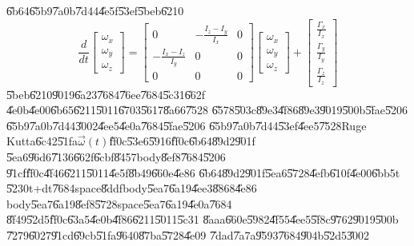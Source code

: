 \documentclass[12pt]{article}
\begin{document}
\U{6b64}\U{65b9}\U{7a0b}\U{7d44}\U{4e5f}\U{53ef}\U{5beb}\U{6210}%
\begin{equation}
\frac{d}{dt}\left[ 
\begin{array}{c}
\omega _{x} \\ 
\omega _{y} \\ 
\omega _{z}%
\end{array}%
\right] =\left[ 
\begin{array}{ccc}
0 & -\frac{I_{z}-I_{y}}{I_{x}} & 0 \\ 
-\frac{I_{x}-I_{z}}{I_{y}} & 0 & 0 \\ 
0 & 0 & 0%
\end{array}%
\right] \left[ 
\begin{array}{c}
\omega _{x} \\ 
\omega _{y} \\ 
\omega _{z}%
\end{array}%
\right] +\left[ 
\begin{array}{c}
\frac{\Gamma _{x}}{I_{x}} \\ 
\frac{\Gamma _{y}}{I_{y}} \\ 
\frac{\Gamma _{z}}{I_{z}}%
\end{array}%
\right] 
\end{equation}%
\U{5beb}\U{6210}\U{9019}\U{6a23}\U{7684}\U{76ee}\U{7684}\U{5c31}\U{662f}%
\U{4e0b}\U{4e00}\U{6b65}\U{6211}\U{5011}\U{6703}\U{5617}\U{8a66}\U{7528}%
\U{6578}\U{503c}\U{89e3}\U{4f86}\U{89e3}\U{9019}\U{500b}\U{5fae}\U{5206}%
\U{65b9}\U{7a0b}\U{7d44}\U{3002}\U{4ee5}\U{4e0a}\U{7684}\U{5fae}\U{5206}%
\U{65b9}\U{7a0b}\U{7d44}\U{53ef}\U{4ee5}\U{7528}Ruge Kutta\U{6c42}\U{51fa}$%
\vec{\omega}(t)$\U{ff0c}\U{53e6}\U{5916}\U{ff0c}\U{6b64}\U{89d2}\U{901f}%
\U{5ea6}\U{96d6}\U{7136}\U{662f}\U{6cbf}\U{8457}body\U{8ef8}\U{7684}\U{5206}%
\U{91cf}\U{ff0c}\U{4f46}\U{6211}\U{5011}\U{4e5f}\U{8b49}\U{660e}\U{4e86}%
\U{6b64}\U{89d2}\U{901f}\U{5ea6}\U{5728}\U{4efb}\U{610f}\U{4e00}\U{6bb5}t%
\U{5230}t+dt\U{7684}space\U{8ddf}body\U{5ea7}\U{6a19}\U{4ee3}\U{8868}\U{4e86}%
body\U{5ea7}\U{6a19}\U{8ef8}\U{5728}space\U{5ea7}\U{6a19}\U{4e0a}\U{7684}%
\U{8f49}\U{52d5}\U{ff0c}\U{63a5}\U{4e0b}\U{4f86}\U{6211}\U{5011}\U{5c31}%
\U{8aaa}\U{660e}\U{5982}\U{4f55}\U{4ee5}\U{5f8c}\U{9762}\U{9019}\U{500b}%
\U{7279}\U{6027}\U{91cd}\U{69cb}\U{51fa}\U{9640}\U{87ba}\U{5728}\U{4e09}%
\U{7dad}\U{7a7a}\U{9593}\U{7684}\U{904b}\U{52d5}\U{3002}\bigskip 

\end{document}
